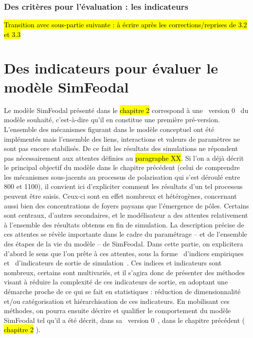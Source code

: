 \subsubsection{Des critères pour l'évaluation : les indicateurs}

\hl{Transition avec sous-partie suivante : à écrire après les corrections/reprises de 3.2 et 3.3}


\section[Des indicateurs pour SimFeodal]{Des indicateurs pour évaluer le modèle SimFeodal}

Le modèle SimFeodal présenté dans le \hl{chapitre 2} correspond à une \og version 0 \fg{} du modèle souhaité, c'est-à-dire qu'il en constitue une première pré-version.
L'ensemble des mécanismes figurant dans le modèle conceptuel ont été implémentés mais l'ensemble des liens, interactions et valeurs de paramètres ne sont pas encore stabilisés.
De ce fait les résultats des simulations ne répondent pas nécessairement aux attentes définies au \hl{paragraphe XX}.
Si l'on a déjà décrit le principal objectif du modèle dans le chapitre précédent (celui de comprendre les mécanismes sous-jacents au processus de polarisation qui s'est déroulé entre 800 et 1100), il convient ici d'expliciter comment les résultats d'un tel processus peuvent être saisis.
Ceux-ci sont en effet nombreux et hétérogènes, concernant aussi bien des concentrations de foyers paysans que l'émergence de pôles.
Certains sont centraux, d'autres secondaires, et le modélisateur a des attentes relativement à l'ensemble des résultats obtenus en fin de simulation.
La description précise de ces attentes se révèle importante dans le cadre du paramétrage -- et de l'ensemble des étapes de la vie du modèle -- de SimFeodal.
Dans cette partie, on explicitera d'abord le sens que l'on prête à ces attentes, sous la forme \og d'indices empiriques \fg{} et \og d'indicateurs de sortie de simulation \fg{}.
Ces indices et indicateurs sont nombreux, certains sont multivariés, et il s'agira donc de présenter des méthodes visant à réduire la complexité de ces indicateurs de sortie, en adoptant une démarche proche de ce qui se fait en statistiques : réduction de dimensionnalité et/ou catégorisation et hiérarchisation de ces indicateurs.
En mobilisant ces méthodes, on pourra ensuite décrire et qualifier le comportement du modèle SimFeodal tel qu'il a été décrit, dans sa \og version 0 \fg{}, dans le chapitre précédent (
\hl{chapitre 2}
).

